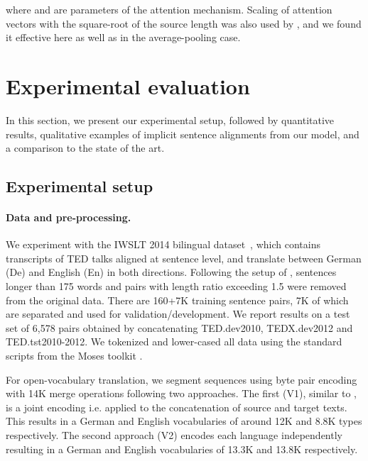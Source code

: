 \documentclass[11pt,a4paper]{article}
\begin{document}
where  and  are parameters of the attention mechanism.
Scaling of attention vectors with the square-root of the source length was also used by \citet{gehring17icml}, and we found it effective here as well  as in the average-pooling case.



 
\section{Experimental evaluation}
\label{sec:experiments}

In this section, we present our experimental setup, 
followed by quantitative results, qualitative examples of implicit sentence alignments from our model, and a comparison to the state of the art.

\subsection{Experimental setup}
\paragraph{Data and pre-processing.}


We experiment with the IWSLT 2014 bilingual dataset~\cite{cettolo14iwslt}, which contains transcripts of TED talks aligned at sentence level, and translate between German (De) and English (En) in both directions.
Following the setup of \cite{edunov18naacl}, sentences longer than 175 words and pairs with length ratio exceeding 1.5 were removed from the original data.
There are 160+7K training sentence pairs, 7K of which are separated and used for validation/development.
We report results on a test set of 6,578 pairs obtained by concatenating TED.dev2010, TEDX.dev2012 and TED.tst2010-2012.
We tokenized and lower-cased all data using the standard scripts from the Moses toolkit \citep{koehn07acl}.

For open-vocabulary translation, we segment sequences using byte pair encoding \cite{sennrich16acl} with 14K merge operations following two approaches. The first (V1), similar to \citet{edunov18naacl, deng18arxiv}, is a joint encoding i.e. applied to the concatenation of source and target texts. This results in a German and English vocabularies of around 12K and 8.8K types respectively. 
The second approach (V2) encodes each language independently resulting in a German and English vocabularies of 13.3K and 13.8K respectively.
\end{document}
